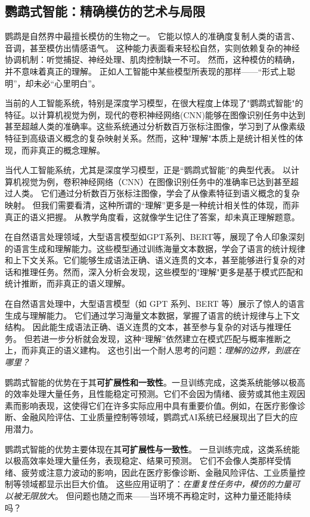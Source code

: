 \subsection{鹦鹉式智能：精确模仿的艺术与局限}

鹦鹉是自然界中最擅长模仿的生物之一。
它能以惊人的准确度复制人类的语言、音调，甚至模仿出情感语气。
这种能力表面看来轻松自然，实则依赖复杂的神经协调机制：听觉捕捉、神经处理、肌肉控制缺一不可。
然而，这种模仿的精确，并不意味着真正的理解。
正如人工智能中某些模型所表现的那样——“形式上聪明”，却未必“心里明白”。

当前的人工智能系统，特别是深度学习模型，在很大程度上体现了"鹦鹉式智能"的特征。以计算机视觉为例，现代的卷积神经网络(CNN)能够在图像识别任务中达到甚至超越人类的准确率。这些系统通过分析数百万张标注图像，学习到了从像素级特征到高级语义概念的复杂映射关系。然而，这种"理解"本质上是统计相关性的体现，而非真正的概念理解。

当代人工智能系统，尤其是深度学习模型，正是“鹦鹉式智能”的典型代表。
以计算机视觉为例，卷积神经网络（CNN）在图像识别任务中的准确率已达到甚至超过人类。
它们通过分析数百万张标注图像，学会了从像素特征到语义概念的复杂映射。
但我们需要看清，这种所谓的“理解”更多是一种统计相关性的体现，而非真正的语义把握。
从教学角度看，这就像学生记住了答案，却未真正理解题意。

在自然语言处理领域，大型语言模型如GPT系列、BERT等，展现了令人印象深刻的语言生成和理解能力。这些模型通过训练海量文本数据，学会了语言的统计规律和上下文关系。它们能够生成语法正确、语义连贯的文本，甚至能够进行复杂的对话和推理任务。然而，深入分析会发现，这些模型的"理解"更多是基于模式匹配和统计推断，而非真正的语义理解。

在自然语言处理中，大型语言模型（如 GPT 系列、BERT 等）展示了惊人的语言生成与理解能力。
它们通过学习海量文本数据，掌握了语言的统计规律与上下文结构。
因此能生成语法正确、语义连贯的文本，甚至参与复杂的对话与推理任务。
但若进一步分析就会发现，这种“理解”依然建立在模式匹配与概率推断之上，而非真正的语义建构。
这也引出一个耐人思考的问题：\emph{理解的边界，到底在哪里？}

鹦鹉式智能的优势在于其\textbf{可扩展性和一致性}。一旦训练完成，这类系统能够以极高的效率处理大量任务，且性能稳定可预测。它们不会因为情绪、疲劳或其他主观因素而影响表现，这使得它们在许多实际应用中具有重要价值。例如，在医疗影像诊断、金融风险评估、工业质量控制等领域，鹦鹉式AI系统已经展现出了巨大的应用潜力。

鹦鹉式智能的优势主要体现在其\textbf{可扩展性与一致性}。
一旦训练完成，这类系统能以极高效率处理大量任务，表现稳定、结果可预测。
它们不会像人类那样受情绪、疲劳或注意力波动的影响，因此在医疗影像诊断、金融风险评估、工业质量控制等领域都显示出巨大价值。
这些应用证明了：\emph{在重复性任务中，模仿的力量可以被无限放大}。
但问题也随之而来——当环境不再稳定时，这种力量还能持续吗？


